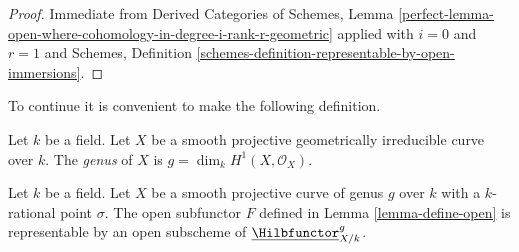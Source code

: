 \begin{proof}
Immediate from Derived Categories of Schemes, Lemma
\ref{perfect-lemma-open-where-cohomology-in-degree-i-rank-r-geometric}
applied with $i = 0$ and $r = 1$ and
Schemes, Definition \ref{schemes-definition-representable-by-open-immersions}.
\end{proof}

\noindent
To continue it is convenient to make the following definition.

\begin{definition}
\label{definition-genus}
Let $k$ be a field. Let $X$ be a smooth projective geometrically irreducible
curve over $k$. The {\it genus} of $X$ is $g = \dim_k H^1(X, \mathcal{O}_X)$.
\end{definition}

\begin{lemma}
\label{lemma-open-representable}
Let $k$ be a field. Let $X$ be a smooth projective curve of genus $g$
over $k$ with a $k$-rational point $\sigma$. The open subfunctor $F$ defined
in Lemma \ref{lemma-define-open} is representable by an open subscheme of
$\underline{\Hilbfunctor}^g_{X/k}$.
\end{lemma}

